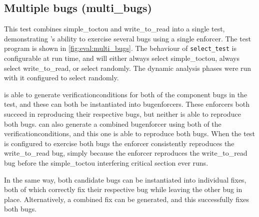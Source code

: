 \subsection{Multiple bugs (multi\_bugs)}

This test combines simple\_toctou and write\_to\_read into a single
test, demonstrating {\technique}'s ability to exercise several bugs
using a single enforcer.  The test program is shown in
\autoref{fig:eval:multi_bugs}.  The behaviour of
\texttt{select\_test} is configurable at run time, and will either
always select simple\_toctou, always select write\_to\_read, or select
randomly.  The dynamic analysis phases were run with it configured to
select randomly.

{\Implementation} is able to generate \glspl{verificationcondition}
for both of the component bugs in the test, and these can both be
instantiated into \glspl{bugenforcer}.  These enforcers both succeed
in reproducing their respective bugs, but neither is able to reproduce
both bugs.  {\Implementation} can also generate a combined
\gls{bugenforcer} using both of the \glspl{verificationcondition}, and
this one is able to reproduce both bugs.  When the test is configured
to exercise both bugs the enforcer consistently reproduces the
write\_to\_read bug, simply because the enforcer reproduces the
write\_to\_read bug before the simple\_toctou interfering critical
section ever runs.

In the same way, both candidate bugs can be instantiated into
individual fixes, both of which correctly fix their respective bug
while leaving the other bug in place.  Alternatively, a combined fix
can be generated, and this successfully fixes both bugs.

